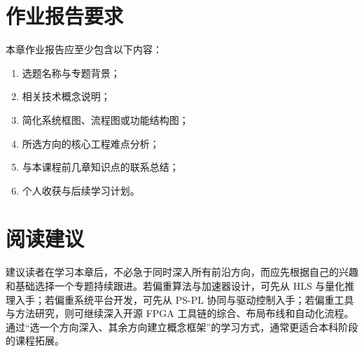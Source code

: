 \section{作业报告要求}\label{ux4f5cux4e1aux62a5ux544aux8981ux6c42}

本章作业报告应至少包含以下内容：

\begin{enumerate}
\def\labelenumi{\arabic{enumi}.}
\tightlist
\item
  选题名称与专题背景；
\item
  相关技术概念说明；
\item
  简化系统框图、流程图或功能结构图；
\item
  所选方向的核心工程难点分析；
\item
  与本课程前几章知识点的联系总结；
\item
  个人收获与后续学习计划。
\end{enumerate}

\section{阅读建议}\label{ux9605ux8bfbux5efaux8bae}

建议读者在学习本章后，不必急于同时深入所有前沿方向，而应先根据自己的兴趣和基础选择一个专题持续跟进。若偏重算法与加速器设计，可先从
HLS 与量化推理入手；若偏重系统平台开发，可先从 PS-PL
协同与驱动控制入手；若偏重工具与方法研究，则可继续深入开源 FPGA
工具链的综合、布局布线和自动化流程。通过``选一个方向深入、其余方向建立概念框架''的学习方式，通常更适合本科阶段的课程拓展。

